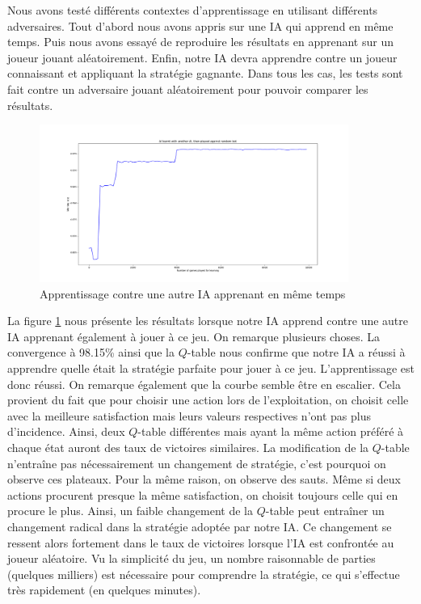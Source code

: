 Nous avons testé différents contextes d'apprentissage en utilisant différents adversaires. Tout d'abord nous avons appris sur une IA qui apprend en même temps. Puis 
nous avons essayé de reproduire les résultats en apprenant sur un joueur jouant aléatoirement. Enfin, notre IA devra apprendre contre un joueur connaissant et 
appliquant la stratégie gagnante. Dans tous les cas, les tests sont fait contre un adversaire jouant aléatoirement pour pouvoir comparer les résultats.

\begin{figure}[h]
 \centering
 \includegraphics[width = 0.9\textwidth]{img/learnWithAI_testRandom.png}
 \caption{Apprentissage contre une autre IA apprenant en même temps}
 \label{fig:learnWithAI}
\end{figure}

La figure \ref{fig:learnWithAI} nous présente les résultats lorsque notre IA apprend contre une autre IA apprenant également à jouer à ce jeu. On remarque plusieurs choses.
La convergence à 98.15\% ainsi que la $Q$-table nous confirme que notre IA a réussi à apprendre quelle était la stratégie parfaite pour jouer à ce jeu. L'apprentissage 
est donc réussi. On remarque également que la courbe semble être en escalier. Cela provient du fait que pour choisir une action lors de l'exploitation, on choisit celle
avec la meilleure satisfaction mais leurs valeurs respectives n'ont pas plus d'incidence. Ainsi, deux $Q$-table différentes mais ayant la même action préféré à chaque état
auront des taux de victoires similaires. La modification de la $Q$-table n'entraîne pas nécessairement un changement de stratégie, c'est pourquoi on observe ces plateaux.
Pour la même raison, on observe des sauts. Même si deux actions procurent presque la même satisfaction, on choisit toujours celle qui en procure le plus. Ainsi, un faible
changement de la $Q$-table peut entraîner un changement radical dans la stratégie adoptée par notre IA. Ce changement se ressent alors fortement dans le taux de victoires
lorsque l'IA est confrontée au joueur aléatoire. Vu la simplicité du jeu, un nombre raisonnable de parties (quelques milliers) est nécessaire pour comprendre la stratégie,
ce qui s'effectue très rapidement (en quelques minutes).

